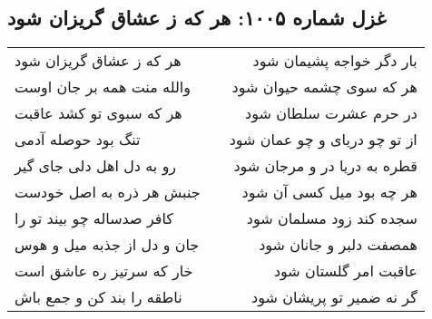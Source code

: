 \begin{center}
\section*{غزل شماره ۱۰۰۵: هر که ز عشاق گریزان شود}
\label{sec:1005}
\begin{longtable}{l p{0.5cm} r}
هر که ز عشاق گریزان شود
&&
بار دگر خواجه پشیمان شود
\\
والله منت همه بر جان اوست
&&
هر که سوی چشمه حیوان شود
\\
هر که سبوی تو کشد عاقبت
&&
در حرم عشرت سلطان شود
\\
تنگ بود حوصله آدمی
&&
از تو چو دریای و چو عمان شود
\\
رو به دل اهل دلی جای گیر
&&
قطره به دریا در و مرجان شود
\\
جنبش هر ذره به اصل خودست
&&
هر چه بود میل کسی آن شود
\\
کافر صدساله چو بیند تو را
&&
سجده کند زود مسلمان شود
\\
جان و دل از جذبه میل و هوس
&&
همصفت دلبر و جانان شود
\\
خار که سرتیز ره عاشق است
&&
عاقبت امر گلستان شود
\\
ناطقه را بند کن و جمع باش
&&
گر نه ضمیر تو پریشان شود
\\
\end{longtable}
\end{center}
